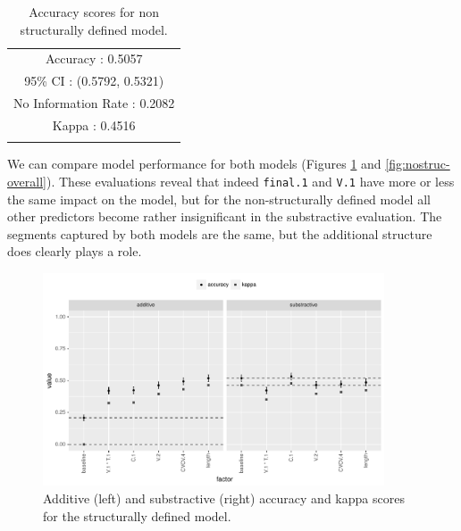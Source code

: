 \begin{table}[!htpb]
  \centering
  \begin{tabular}{rl}
    \lsptoprule
    \multicolumn{2}{c}{Overall Statistics}                                         \\
    \midrule
    \multicolumn{2}{c}{Accuracy : 0.5057}                                          \\
    \multicolumn{2}{c}{95\% CI : (0.5792, 0.5321)}                                  \\
    \multicolumn{2}{c}{No Information Rate : 0.2082}                               \\
    \multicolumn{2}{c}{Kappa : 0.4516}                                             \\
    \lspbottomrule
  \end{tabular}
  \caption{Accuracy scores for non structurally defined model.}\label{tab:class-hausa-stats-2}
\end{table}

We can compare model performance for both models (Figures \ref{fig:struc-overall} and \ref{fig:nostruc-overall}). These evaluations reveal that indeed \texttt{final.1} and \texttt{V.1} have more or less the same impact on the model, but for the non-structurally defined model all other predictors become rather insignificant in the substractive evaluation. The segments captured by both models are the same, but the additional structure does clearly plays a role.

\begin{figure}[!htpb]
    \centering  \includegraphics[width=0.9\textwidth]{./figures/hausa/struc-overall.pdf}
    \caption{Additive (left) and substractive (right) accuracy and kappa scores for the structurally defined model.}\label{fig:struc-overall}
\end{figure}

